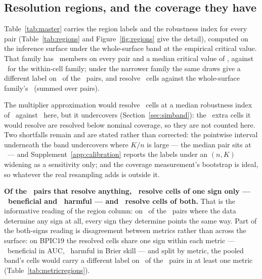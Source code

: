 \documentclass[11pt,3p,review,authoryear]{elsarticle}
\theoremstyle{definition}
\begin{document}
\subsection{Resolution regions, and the coverage they have}
\label{sec:regions}

Table~\ref{tab:master} carries the region labels and the robustness index
for every pair (Table~\ref{tab:regions} and Figure~\ref{fig:regions} give the
detail), computed on the inference surface under the whole-surface band at
the empirical critical value. That family has \familySizeMedian\
members on every pair and a median critical value of \maxTSurfaceMedian, against
\maxTWithinMedian\ for the within-cell family; under the narrower family the
same draws give a different label on \nRegionChangedByFamily\ of the
\nPairs\ pairs, and resolve \nResolvedWithin\ cells against the whole-surface
family's \nResolvedWhole\ (summed over pairs).

The multiplier approximation would resolve \nResolvedWholeMult\ cells at a
median robustness index of \rhoMedianMult\ against \rhoMedian\ here, but it
undercovers (Section~\ref{sec:simband}): the \nResolvedLostToEmp\ extra
cells it would resolve are resolved below nominal coverage, so they are not
counted here. Two shortfalls remain and are stated rather than corrected: the
pointwise interval underneath the band undercovers where $K/n$ is large ---
the median pair sits at \medianKoverN\ --- and Supplement~\ref{app:calibration}
reports the labels under an $(n, K)$ widening as a sensitivity only; and the
coverage measurement's bootstrap is ideal, so whatever the real resampling
adds is outside it.

\textbf{Of the \nPairsResolvingAny\ pairs that resolve anything,
\nPairsResolveOneSign\ resolve cells of one sign only ---
\nPairsResolveBeneficialOnly\ beneficial and
\nPairsResolveHarmfulOnly\ harmful --- and
\nPairsResolveBothSigns\ resolve cells of both.} That is the informative
reading of the region column: on \nPairsResolveOneSign\ of the
\nPairsResolvingAny\ pairs where the data determine any sign at all, every
sign they determine points the same way. Part of the both-signs reading is
disagreement between metrics rather than across the surface: on BPIC19 the
resolved cells share one sign within each metric --- \nBpicNineteenBenAuc\
beneficial in AUC, \nBpicNineteenHarmBrier\ harmful in Brier skill --- and
split by metric, the pooled band's cells would carry a different label on
\nPairsLabelDiffersAny\ of the \nPairs\ pairs in at least one metric
(Table~\ref{tab:metricregions}).
\end{document}

